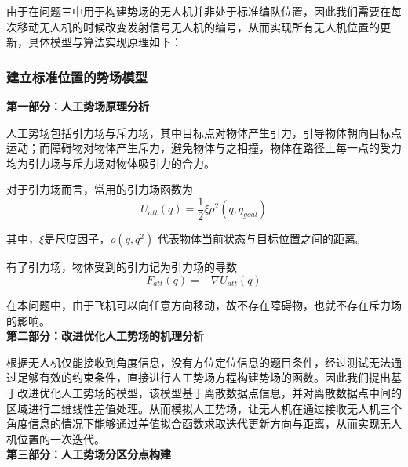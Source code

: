\documentclass{my_paper}
\begin{document}
由于在问题三中用于构建势场的无人机并非处于标准编队位置，因此我们需要在每次移动无人机的时候改变发射信号无人机的编号，从而实现所有无人机位置的更新，具体模型与算法实现原理如下：

\subsubsection{建立标准位置的势场模型}

\textbf{第一部分：人工势场原理分析}

人工势场包括引力场与斥力场，其中目标点对物体产生引力，引导物体朝向目标点运动；而障碍物对物体产生斥力，避免物体与之相撞，物体在路径上每一点的受力均为引力场与斥力场对物体吸引力的合力。\cite{kownacki2017local}

对于引力场而言，常用的引力场函数为
\begin{equation}
    U_{att}(q) = \frac{1}{2} \xi \rho^{2} (q, q_{goal}) 
\end{equation}

其中，$\xi$是尺度因子，$\rho(q, q^2)$ 代表物体当前状态与目标位置之间的距离。

有了引力场，物体受到的引力记为引力场的导数
\begin{equation}
    F_{att}(q) = -\nabla U_{att}(q)
\end{equation}

在本问题中，由于飞机可以向任意方向移动，故不存在障碍物，也就不存在斥力场的影响。\cite{张鲲2018海上侦察船的纯方位无源定位技术研究}\\

\textbf{第二部分：改进优化人工势场的机理分析}

根据无人机仅能接收到角度信息，没有方位定位信息的题目条件，经过测试无法通过足够有效的约束条件，直接进行人工势场方程构建势场的函数。因此我们提出基于改进优化人工势场的模型，该模型基于离散数据点信息，并对离散数据点中间的区域进行二维线性差值处理。从而模拟人工势场，让无人机在通过接收无人机三个角度信息的情况下能够通过差值拟合函数求取迭代更新方向与距离，从而实现无人机位置的一次迭代。\\

\textbf{第三部分：人工势场分区分点构建}
\end{document}
